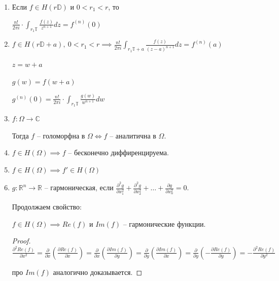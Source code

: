 \begin{consequence}
    \begin{enumerate}
        \item {
            Если $f \in H(r \mathbb{D})$ и $0 < r_1 < r$, то
    
            $\frac{n!}{2 \pi i} \cdot \int_{r_1 \mathbb{T}} { \frac{f(z)}{z^{n+1}} dz } = f^{(n)} (0)$
        }
        \item {
            $f \in H(r \mathbb{D} + a), \ 0 < r_1 < r \implies \frac{n!}{2 \pi i} \int_{r_1 \mathbb{T} + a} { \frac{f(z)}{(z - a)^{n + 1}} dz } = f^{(n)} (a)$

            $z = w + a$

            $g(w) = f(w + a)$

            $g^{(n)} (0) = \frac{n!}{2 \pi i} \cdot \int_{r_1 \mathbb{T}} { \frac{g(w)}{w^{n + 1}} dw }$
        }
        \item {
            $f: \Omega \rightarrow \mathbb{C}$

            Тогда $f$ -- голоморфна в $\Omega \Leftrightarrow f$ -- аналитична в $\Omega$.

        }
        \item {
            $f \in H(\Omega) \implies f$ -- бесконечно диффиренцируема.
        }
        \item {
            $f \in H(\Omega) \implies f' \in H(\Omega)$
        }
        \item {
            \begin{definition}
                $g: \mathbb{R}^n \rightarrow \mathbb{R}$ -- гармоническая, если $\frac{\partial^2 g}{\partial x_1^2} + \frac{\partial^2 g}{\partial x_2^2} + \dots + \frac{\partial g}{\partial x_n^2} = 0$.
            \end{definition}
            
            Продолжаем свойство:

            $f \in H(\Omega) \implies Re (f)$ и $Im(f)$ -- гармонические функции.
            
            \begin{proof}
                $\frac{\partial^2 Re(f)}{\partial x^2} = \frac{\partial}{\partial x} \left( \frac{\partial Re (f)}{\partial x} \right) = \frac{\partial}{\partial x} \left( \frac{\partial Im(f)}{\partial y} \right) = \frac{\partial}{\partial y} \left( \frac{\partial Im(f)}{\partial x} \right) = \frac{\partial}{\partial y} \left( - \frac{\partial Re(f)}{\partial y} \right) = - \frac{\partial^2 Re(f)}{\partial y^2}$

                про $Im(f)$ аналогично доказывается.
            \end{proof}
        }
    \end{enumerate}
\end{consequence}

